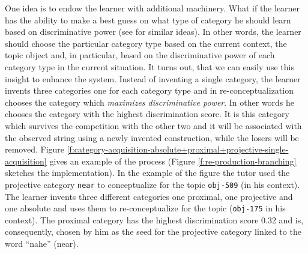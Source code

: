 One idea is to endow the learner with additional machinery.
What if the learner has the ability to make a best guess on 
what type of category he should learn based on discriminative power
(see \citealp{steels1997distinctions} for similar ideas). 
In other words, the learner should choose the particular category type
based on the current context, the topic object and, in particular, based on 
the discriminative power of each category type in the current situation.
It turns out, that we can easily use this insight to enhance the system. 
Instead of inventing a single category, the learner invents three
categories one for each category type and in re-conceptualization chooses
the category which \emph{maximizes discriminative power}.
In other words he chooses the category with the highest discrimination score. 
It is this category which survives the 
competition with the other two and it will be associated with the observed string
using a newly invented construction, while the losers will be removed.
Figure \ref{f:category-acquisition-absolute+proximal+projective-single-acquisition} 
gives an example of the process (Figure \ref{f:re-production-branching} sketches the implementation).
In the example of the figure the tutor used the projective 
category {\footnotesize\tt near} to conceptualize for the topic 
{\footnotesize\tt obj-509} (in his context). The learner invents three 
different categories one proximal, one projective and one absolute and
uses them to re-conceptualize for the topic ({\footnotesize\tt obj-175} in his context). 
The proximal category has the highest discrimination score 0.32 
and is, consequently, chosen by him as the seed for the projective 
category linked to the word ``nahe'' (near).

